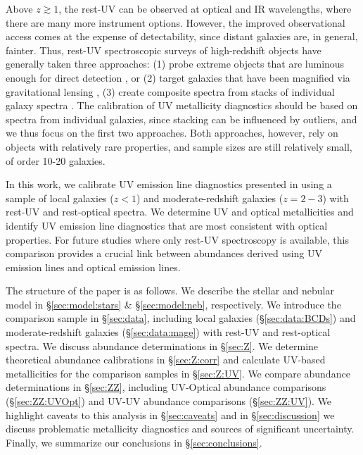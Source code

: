 \documentclass[preprint2]{aastex62}
\begin{document}
Above $z\gtrsim 1$, the rest-UV can be observed at optical and IR wavelengths, where there are many more instrument options. However, the improved observational access comes at the expense of detectability, since distant galaxies are, in general, fainter. Thus, rest-UV spectroscopic surveys of high-redshift objects have generally taken three approaches: (1) probe extreme objects that are luminous enough for direct detection \citep[e.g., ][]{Erb+2010, Stark+2014}, or (2) target galaxies that have been magnified via gravitational lensing \citep[e.g.,][]{Rigby+2018a}, (3) create composite spectra from stacks of individual galaxy spectra \citep[e.g.,][]{Shapley+2003, Steidel+2016}. The calibration of UV metallicity diagnostics should be based on spectra from individual galaxies, since stacking can be influenced by outliers, and we thus focus on the first two approaches. Both approaches, however, rely on objects with relatively rare properties, and sample sizes are still relatively small, of order 10-20 galaxies.

In this work, we calibrate UV emission line diagnostics presented in \citet{Byler+2018} using a sample of local galaxies ($z < 1$) and moderate-redshift galaxies ($z=2-3$) with rest-UV and rest-optical spectra.
We determine UV and optical metallicities and identify UV emission line diagnostics that are most consistent with optical properties. For future studies where only rest-UV spectroscopy is available, this comparison provides a crucial link between abundances derived using UV emission lines and optical emission lines.

The structure of the paper is as follows. We describe the stellar and nebular model in \S\ref{sec:model:stars} \& \S\ref{sec:model:neb}, respectively. We introduce the comparison sample in \S\ref{sec:data}, including local galaxies (\S\ref{sec:data:BCDs}) and moderate-redshift galaxies (\S\ref{sec:data:mage}) with rest-UV and rest-optical spectra. We discuss abundance determinations in \S\ref{sec:Z}. We determine theoretical abundance calibrations in \S\ref{sec:Z:corr} and calculate UV-based metallicities for the comparison samples in \S\ref{sec:Z:UV}. We compare abundance determinations in \S\ref{sec:ZZ}, including UV-Optical abundance comparisons (\S\ref{sec:ZZ:UVOpt}) and UV-UV abundance comparisons (\S\ref{sec:ZZ:UV}). We highlight caveats to this analysis in \S\ref{sec:caveats} and in \S\ref{sec:discussion} we discuss problematic metallicity diagnostics and sources of significant uncertainty. Finally, we summarize our conclusions in \S\ref{sec:conclusions}.
\end{document}
